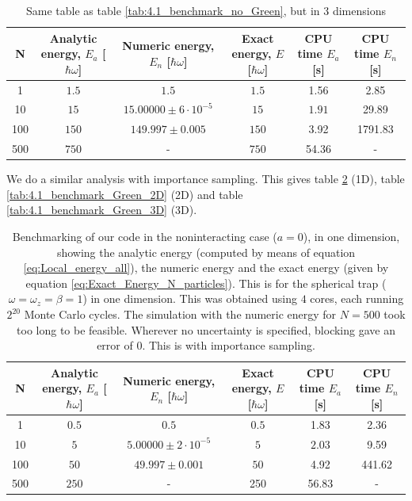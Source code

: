 \documentclass[a4paper, 10pt]{article}
\begin{document}
		\begin{table}[ht!]
			\begin{adjustwidth}{-2cm}{}
				\begin{tabular}{cccccc}
					N & Analytic energy, $E_a$ [$\hbar \omega$] & Numeric energy, $E_n$ [$\hbar \omega$] & Exact energy, $E$ [$\hbar \omega$]& CPU time $E_a$ [s] &CPU time $E_n$ [s]\\
					\hline
					1&$1.5$&$1.5$&$1.5$& 1.56&2.85\\
					10&$15$&$15.00000\pm 6\cdot 10^{-5}$&$15$& $1.91$&29.89\\
					100&$150$&$149.997\pm 0.005$&$150$&3.92&1791.83\\
					500&$750$&- &$750$&54.36 &-
				\end{tabular}
			\end{adjustwidth}
			\caption{Same table as table \ref{tab:4.1_benchmark_no_Green}, but in 3 dimensions}\label{tab:4.1_benchmark_no_Green_3D}
		\end{table}
		We do a similar analysis with importance sampling. This gives table \ref{tab:4.1_benchmark_Green} (1D), table \ref{tab:4.1_benchmark_Green_2D} (2D) and table \ref{tab:4.1_benchmark_Green_3D} (3D).
		 \begin{table}[ht!]
			\begin{adjustwidth}{-2cm}{}
				\begin{tabular}{cccccc}
					N & Analytic energy, $E_a$ [$\hbar \omega$] & Numeric energy, $E_n$ [$\hbar \omega$] & Exact energy, $E$ [$\hbar \omega$]& CPU time $E_a$ [s] &CPU time $E_n$ [s]\\
					\hline
					1&$0.5$&$0.5$&$0.5$& 1.83&2.36\\
					10&$5$&$5.00000\pm 2\cdot 10^{-5}$&$5$& $2.03$&9.59\\
					100&$50$&$49.997\pm 0.001$&$50$&4.92&441.62\\
					500&$250$&-&250 &56.83 &-
				\end{tabular}
			\end{adjustwidth}
			\caption{Benchmarking of our code in the noninteracting case ($a=0$), in one dimension, showing the analytic energy (computed by means of equation \ref{eq:Local_energy_all}), the numeric energy and the exact energy (given by equation \ref{eq:Exact_Energy_N_particles}). This is for the spherical trap ($\omega=\omega_z=\beta=1$) in one dimension. This was obtained using $4$ cores, each running $2^{20}$ Monte Carlo cycles. The simulation with the numeric energy for $N=500$ took too long to be feasible. Wherever no uncertainty is specified, blocking gave an error of $0$. This is with importance sampling.}\label{tab:4.1_benchmark_Green}
		\end{table}
\end{document}
